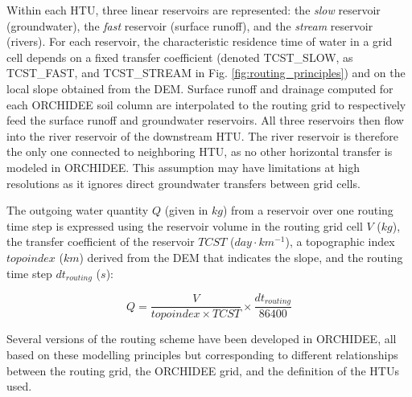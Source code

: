 Within each HTU, three linear reservoirs are represented: the \textit{slow} reservoir (groundwater), the \textit{fast} reservoir (surface runoff), and the \textit{stream} reservoir (rivers). For each reservoir, the characteristic residence time of water in a grid cell depends on a fixed transfer coefficient (denoted TCST\_SLOW, as TCST\_FAST, and TCST\_STREAM in Fig. \ref{fig:routing_principles}) and on the local slope obtained from the DEM.
Surface runoff and drainage computed for each ORCHIDEE soil column are interpolated to the routing grid to respectively feed the surface runoff and groundwater reservoirs. All three reservoirs then flow into the river reservoir of the downstream HTU. The river reservoir is therefore the only one connected to neighboring HTU, as no other horizontal transfer is modeled in ORCHIDEE. This assumption may have limitations at high resolutions as it ignores direct groundwater transfers between grid cells.

The outgoing water quantity $Q$ (given in $kg$) from a reservoir over one routing time step is expressed using the reservoir volume in the routing grid cell $V$ ($kg$), the transfer coefficient of the reservoir $TCST$ ($day \cdot km^{-1}$), a topographic index $topoindex$ ($km$) derived from the DEM that indicates the slope, and the routing time step $dt_{routing}$ ($s$):

\begin{equation}
    Q = \frac{V}{topoindex \times TCST} \times \frac{dt_{routing}}{86400}
\end{equation}

Several versions of the routing scheme have been developed in ORCHIDEE, all based on these modelling principles but corresponding to different relationships between the routing grid, the ORCHIDEE grid, and the definition of the HTUs used.

